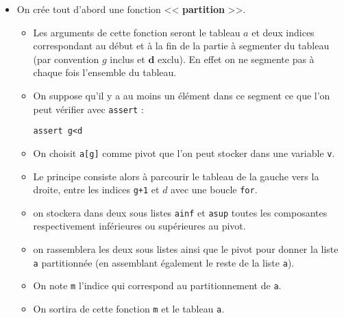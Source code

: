 \begin{itemize}
\item On crée tout d'abord une fonction << \textbf{partition} >>. 
\begin{itemize}
\item Les arguments de cette fonction seront le tableau \textbf{$a$} et deux indices correspondant au début et à la fin de la partie à segmenter du tableau (par convention \textbf{$g$} inclus et $\textbf{d}$ exclu). En effet on ne segmente pas à chaque fois l'ensemble du tableau.
\item On suppose qu'il y a au moins un élément dans ce segment ce que l'on peut vérifier avec \texttt{assert} : 

\begin{lstlisting}
assert g<d
\end{lstlisting}
\item On choisit \texttt{a[g]} comme pivot que l'on peut stocker dans une variable \texttt{v}.
\item Le principe consiste alors à parcourir le tableau de la gauche vers la droite, entre les indices \texttt{g+1} et \textbf{$d$} avec une boucle \texttt{for}.
\item on stockera dans deux sous listes \texttt{ainf} et \texttt{asup} toutes les composantes respectivement inférieures ou supérieures au pivot.
\item on rassemblera les deux sous listes ainsi que le pivot pour donner la liste \texttt{a} partitionnée (en assemblant également le reste de la liste \texttt{a}).
\item On note \texttt{m} l'indice qui correspond au partitionnement de \texttt{a}.
\item On sortira de cette fonction \texttt{m} et le tableau \texttt{a}.
\end{itemize}
\end{itemize}


